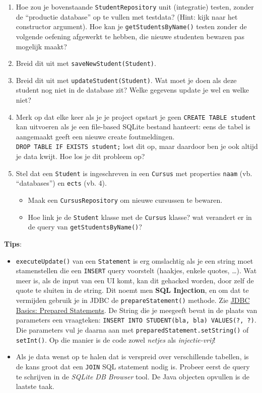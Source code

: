 \documentclass[
]{article}
\providecommand{\tightlist}{%
  \setlength{\itemsep}{0pt}\setlength{\parskip}{0pt}}
\begin{document}
\begin{enumerate}
\def\labelenumi{\arabic{enumi}.}
\setcounter{enumi}{1}
\tightlist
\item
  Hoe zou je bovenstaande \texttt{StudentRepository} unit (integratie)
  testen, zonder de ``productie database'' op te vullen met testdata?
  (Hint: kijk naar het constructor argument). Hoe kan je
  \texttt{getStudentsByName()} testen zonder de volgende oefening
  afgewerkt te hebben, die nieuwe studenten bewaren pas mogelijk maakt?
\item
  Breid dit uit met \texttt{saveNewStudent(Student)}.
\item
  Breid dit uit met \texttt{updateStudent(Student)}. Wat moet je doen
  als deze student nog niet in de database zit? Welke gegevens update je
  wel en welke niet?
\item
  Merk op dat elke keer als je je project opstart je geen
  \texttt{CREATE\ TABLE\ student} kan uitvoeren als je een file-based
  SQLite bestand hanteert: eens de tabel is aangemaakt geeft een nieuwe
  create foutmeldingen. \texttt{DROP\ TABLE\ IF\ EXISTS\ student;} lost
  dit op, maar daardoor ben je ook altijd je data kwijt. Hoe los je dit
  probleem op?
\item
  Stel dat een \texttt{Student} is ingeschreven in een \texttt{Cursus}
  met properties \texttt{naam} (vb. ``databases'') en \texttt{ects} (vb.
  4).

  \begin{itemize}
  \tightlist
  \item
    Maak een \texttt{CursusRepository} om nieuwe cursussen te bewaren.
  \item
    Hoe link je de \texttt{Student} klasse met de \texttt{Cursus}
    klasse? wat verandert er in de query van
    \texttt{getStudentsByName()}?
  \end{itemize}
\end{enumerate}

\textbf{Tips}:

\begin{itemize}
\tightlist
\item
  \texttt{executeUpdate()} van een \texttt{Statement} is erg omslachtig
  als je een string moet stamenstellen die een \texttt{INSERT} query
  voorstelt (haakjes, enkele quotes, \ldots). Wat meer is, als de input
  van een UI komt, kan dit gehacked worden, door zelf de quote te
  sluiten in de string. Dit noemt men \textbf{SQL Injection}, en om dat
  te vermijden gebruik je in JDBC de \texttt{prepareStatement()}
  methode. Zie
  \href{https://docs.oracle.com/javase/tutorial/jdbc/basics/prepared.html}{JDBC
  Basics: Prepared Statements}. De String die je meegeeft bevat in de
  plaats van parameters een vraagteken:
  \texttt{INSERT\ INTO\ STUDENT(bla,\ bla)\ VALUES(?,\ ?)}. Die
  parameters vul je daarna aan met
  \texttt{preparedStatement.setString()} of \texttt{setInt()}. Op die
  manier is de code zowel \emph{netjes} als \emph{injectie-vrij}!
\item
  Als je data wenst op te halen dat is verspreid over verschillende
  tabellen, is de kans groot dat een \texttt{JOIN} SQL statement nodig
  is. Probeer eerst de query te schrijven in de \emph{SQLite DB Browser}
  tool. De Java objecten opvullen is de laatste taak.
\end{itemize}
\end{document}
